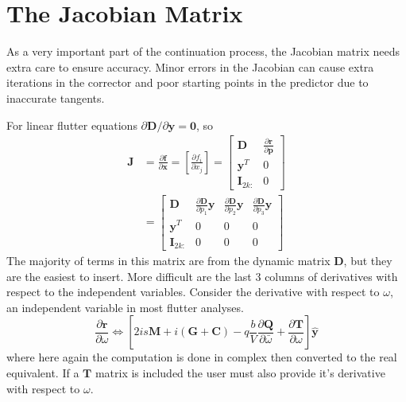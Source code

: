\documentclass[10pt,openany,twoside]{book}
\numberwithin{equation}{section}   %
\newcommand{\Matrix}[1]{\boldsymbol{#1}}
\newcommand{\Vector}[1]{\boldsymbol{#1}}
\begin{document}
\section{The Jacobian Matrix}
As a very important part of the continuation process, the Jacobian
matrix needs extra care to ensure accuracy. Minor errors in the
Jacobian can cause extra iterations in the corrector and poor starting
points in the predictor due to inaccurate tangents.

For linear flutter equations
$\partial \Matrix{D}/\partial \Vector{y} = \Vector{0}$,
so
\begin{align}
	\Matrix{J} &= \frac{\partial \Vector{f}}{\partial \Vector{x}} =
		\left[\frac{\partial f_i}{\partial x_j}\right]
		= \left[ \begin{array}{cc}
			\Matrix{D} & \frac{\partial \Vector{r}}{\partial \Vector{p}} \\
			\Vector{y}^T & 0 \\
			\Matrix{I}_{2k:} & 0
		\end{array}\right]		\nonumber \\
			&= \left[ \begin{array}{cccc}
				\Matrix{D} & \frac{\partial \Matrix{D}}{\partial p_1}\Vector{y}
					& \frac{\partial \Matrix{D}}{\partial p_2}\Vector{y}
					& \frac{\partial \Matrix{D}}{\partial p_3}\Vector{y}	\\
				\Vector{y}^T & 0 & 0 & 0	\\
				\Matrix{I}_{2k:} & 0 & 0 & 0
		\end{array}\right]
\end{align}
The majority of terms in this matrix are from the dynamic matrix $\Vector{D}$,
but they are the easiest to insert. More difficult are the last 3 columns
of derivatives with respect to the independent variables. Consider
the derivative with respect to $\omega$, an independent variable in most
flutter analyses.
\begin{equation}\label{eqn:jac-omega}
	\frac{\partial \Matrix{r}}{\partial \omega} \Leftrightarrow
		\left[ 2is\Matrix{M} + i\left(\Matrix{G} + \Matrix{C}\right)
			- q\frac{b}{V}\frac{\partial \Matrix{Q}}{\partial \bar{\omega}}
			+ \frac{\partial \Matrix{T}}{\partial \omega} \right]\hat{\Vector{y}}
\end{equation}
where here again the computation is done in complex then converted to
the real equivalent.
If a $\Matrix{T}$ matrix is included the user must
also provide it's derivative with respect to $\omega$.
\end{document}
